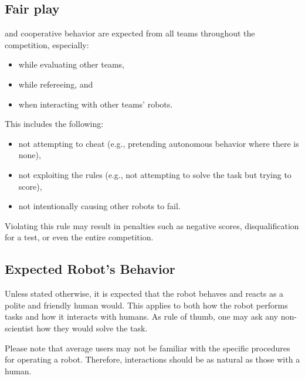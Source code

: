 \subsection{Fair play}\label{rule:fairplay}
 and cooperative behavior are expected from all teams throughout the competition, especially:
\begin{itemize}
	\item while evaluating other teams,
	\item while refereeing, and
	\item when interacting with other teams' robots.
\end{itemize}
This includes the following:
\begin{itemize}
	\item not attempting to cheat (e.g., pretending autonomous behavior where there is none),
	\item not exploiting the rules (e.g., not attempting to solve the task but trying to score),
	\item not intentionally causing other robots to fail.
\end{itemize}
Violating this rule may result in penalties such as negative scores, disqualification for a test, or even the entire competition.

\subsection{Expected Robot's Behavior}
Unless stated otherwise, it is expected that the robot behaves and reacts as a polite and friendly human would.
This applies to both how the robot performs tasks and how it interacts with humans.
As rule of thumb, one may ask any non-scientist how they would solve the task.

Please note that average users may not be familiar with the specific procedures for operating a robot. Therefore, interactions should be as natural as those with a human.


